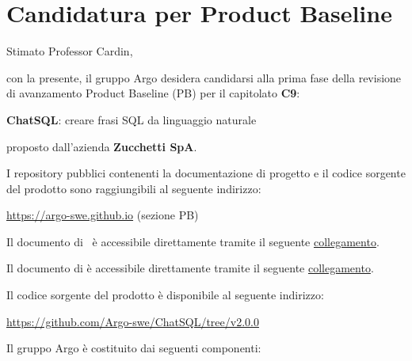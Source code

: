 





\makeFrontPage

\section*{Candidatura per Product Baseline}
\par Stimato Professor Cardin, \newline

con la presente, il gruppo Argo desidera candidarsi alla prima fase della revisione di avanzamento Product Baseline (PB) per il capitolato \textbf{C9}: \newline

\quad \textbf{ChatSQL}: creare frasi SQL da linguaggio naturale \newline

proposto dall'azienda \textbf{Zucchetti SpA}. \newline

\par I repository pubblici contenenti la documentazione di progetto e il codice sorgente del prodotto sono raggiungibili al seguente indirizzo: \newline

\quad \href{https://argo-swe.github.io}{https://argo-swe.github.io} (sezione PB) \newline

\par Il documento di \AdR\ è accessibile direttamente tramite il seguente \href{https://argo-swe.github.io/3_PB/AnalisiDeiRequisiti.pdf}{collegamento}. \newline
\par Il documento di \ST{} è accessibile direttamente tramite il seguente \href{https://argo-swe.github.io/3_PB/SpecificaTecnica.pdf}{collegamento}. \newline

\par Il codice sorgente del prodotto è disponibile al seguente indirizzo: \newline

\quad \href{https://github.com/Argo-swe/ChatSQL/tree/v2.0.0}{https://github.com/Argo-swe/ChatSQL/tree/v2.0.0} \newline

\par Il gruppo Argo è costituito dai seguenti componenti: 

